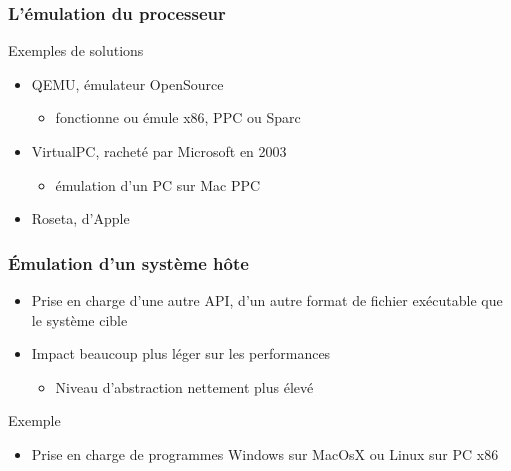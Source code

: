 \begin{frame}
\frametitle{L’émulation du processeur}
\begin{exampleblock}{Exemples de solutions}
\begin{itemize}
\item QEMU, émulateur OpenSource
\begin{itemize}
\item fonctionne ou émule x86, PPC ou Sparc
\end{itemize}
\item VirtualPC, racheté par Microsoft en 2003
\begin{itemize}
\item émulation d'un PC sur Mac PPC
\end{itemize}
\item Roseta, d'Apple
\end{itemize}
\end{exampleblock}
\end{frame}

\begin{frame}
\frametitle{Émulation d'un système hôte}
\begin{itemize}
\item Prise en charge d'une autre API, d'un autre format de fichier exécutable que le système cible
\item Impact beaucoup plus léger sur les performances
\begin{itemize}
\item Niveau d'abstraction nettement plus élevé
\end{itemize}
\end{itemize}
\begin{exampleblock}{Exemple} 
\begin{itemize}
\item Prise en charge de programmes Windows sur MacOsX ou Linux sur PC x86
\end{itemize}
\end{exampleblock}
\end{frame}

